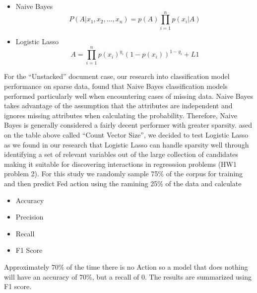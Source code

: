 \documentclass[11pt]{article}
\newcommand{\vertSpace}[1]{\vspace{3mm}}
\begin{document}
{\begin{itemize}
\item Naive Bayes
\begin{equation*}
P(A|x_1,x_2,...,x_n) = p(A)\prod_{i=1}^n p(x_i|A)
\end{equation*}

\item Logistic Lasso
\begin{equation*}
A = \prod_{i=1}^n p(x_i)^{y_i}(1-p(x_i))^{1-y_i}+ L1
\end{equation*}
\end{itemize}



For the ``Unstacked'' document case, our research into classification model performance on sparse data, found that Naive Bayes classification models performed particularly well when encountering cases of missing data.  Naive Bayes takes advantage of the assumption that the attributes are independent and ignores missing attributes when calculating the probability.  Therefore, Naive Bayes is generally considered a fairly decent performer with greater sparsity.  \vertSpace  


Based on the table above called ``Count Vector Size'', we decided to test Logistic Lasso as we found in our research that Logistic Lasso can handle sparsity well through identifying a set of relevant variables out of the large collection of candidates making it suitable for discovering interactions in regresssion problems (HW1 problem 2). \vertSpace 





\subsubsection{Training, Testing and Determining the efficacy of the Models}
For this study we randomly sample 75$\%$ of the corpus for training and then 
predict Fed action using the ramining 25$\%$ of the data and calculate
\begin{itemize}
\item Accuracy
\item Precision
\item Recall
\item F1 Score
\end{itemize}
Approximately 70$\%$ of the time there is no Action so a model that does nothing will
have an accuracy of 70$\%$, but a recall of 0.  The results are summarized using F1
score.

}
\end{document}
